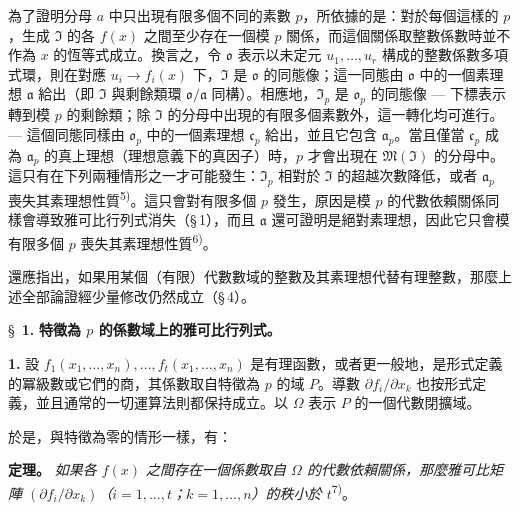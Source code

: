 \documentclass[11pt]{article}
\begin{document}
為了證明分母 $a$ 中只出現有限多個不同的素數 $p$，所依據的是：對於每個這樣的 $p$，生成 $\mathfrak{I}$ 的各 $f(x)$ 之間至少存在一個模 $p$ 關係，而這個關係取整數係數時並不作為 $x$ 的恆等式成立。換言之，令 $\mathfrak{o}$ 表示以未定元 $u_1,\ldots,u_r$ 構成的整數係數多項式環，則在對應 $u_i \to f_i(x)$ 下，$\mathfrak{I}$ 是 $\mathfrak{o}$ 的同態像；這一同態由 $\mathfrak{o}$ 中的一個素理想 $\mathfrak{a}$ 給出（即 $\mathfrak{I}$ 與剩餘類環 $\mathfrak{o}/\mathfrak{a}$ 同構）。相應地，$\mathfrak{I}_p$ 是 $\mathfrak{o}_p$ 的同態像 --- 下標表示轉到模 $p$ 的剩餘類；除 $\mathfrak{I}$ 的分母中出現的有限多個素數外，這一轉化均可進行。--- 這個同態同樣由 $\mathfrak{o}_p$ 中的一個素理想 $\mathfrak{c}_p$ 給出，並且它包含 $\mathfrak{a}_p$。當且僅當 $\mathfrak{c}_p$ 成為 $\mathfrak{a}_p$ 的真上理想（理想意義下的真因子）時，$p$ 才會出現在 $\mathfrak{M}(\mathfrak{I})$ 的分母中。這只有在下列兩種情形之一才可能發生：$\mathfrak{I}_p$ 相對於 $\mathfrak{I}$ 的超越次數降低，或者 $\mathfrak{a}_p$ 喪失其素理想性質\textsuperscript{5)}。這只會對有限多個 $p$ 發生，原因是模 $p$ 的代數依賴關係同樣會導致雅可比行列式消失（\S\,1），而且 $\mathfrak{a}$ 還可證明是絕對素理想，因此它只會模有限多個 $p$ 喪失其素理想性質\textsuperscript{6)}。

還應指出，如果用某個（有限）代數數域的整數及其素理想代替有理整數，那麼上述全部論證經少量修改仍然成立（\S\,4）。

\bigskip
\S~\textbf{1.}
\textbf{特徵為 $p$ 的係數域上的雅可比行列式。}

\smallskip

\noindent\textbf{1.}
設 $f_1(x_1,\ldots,x_n),\ldots,f_t(x_1,\ldots,x_n)$ 是有理函數，或者更一般地，是形式定義的冪級數或它們的商，其係數取自特徵為 $p$ 的域 $P$。導數 $\partial f_i/\partial x_k$ 也按形式定義，並且通常的一切運算法則都保持成立。以 $\Omega$ 表示 $P$ 的一個代數閉擴域。

於是，與特徵為零的情形一樣，有：

\noindent\textbf{定理。}
\textit{如果各 $f(x)$ 之間存在一個係數取自 $\Omega$ 的代數依賴關係，那麼雅可比矩陣 $(\partial f_i/\partial x_k)$（$i=1,\ldots,t$；$k=1,\ldots,n$）的秩小於 $t$}\textsuperscript{7)}。
\end{document}
